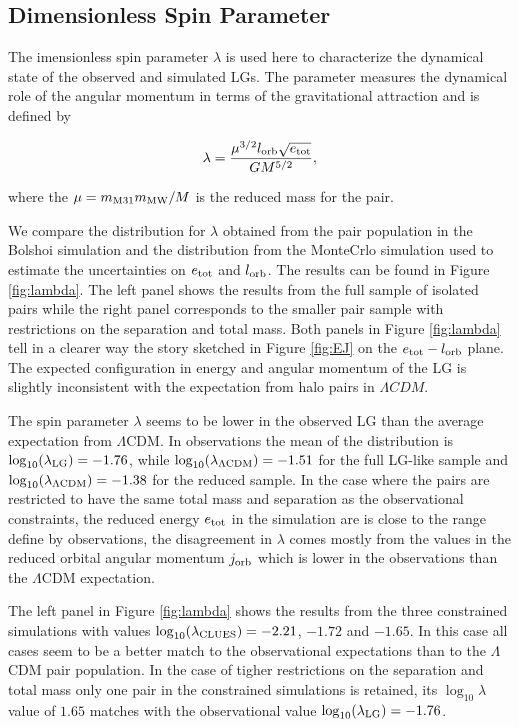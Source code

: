 \documentclass{emulateapj}
\begin{document}
\subsection{Dimensionless Spin Parameter}

The imensionless spin parameter $\lambda$ \citep{Peebles1971} is used here to characterize the dynamical state of the observed and simulated LGs. The parameter measures the dynamical role of the angular momentum in terms of the gravitational attraction and is defined by

\begin{equation}
\lambda = \frac{\mu^{3/2} l_{\rm orb} \sqrt{e_{\rm tot}}}{G M^{5/2}}, 
\end{equation}

where the $\mu=m_{\rm M31}m_{\rm MW}/M$ is the reduced mass for the pair.


We compare the distribution for  $\lambda$ obtained from the pair population in the Bolshoi simulation and the distribution from the MonteCrlo simulation used to estimate the uncertainties on $e_{\rm tot}$ and $l_{\rm orb}$. The results can be found in Figure \ref{fig:lambda}. The left panel shows the results from the full sample of isolated pairs while the right panel corresponds to the smaller pair sample with restrictions on the separation and total mass. Both panels in Figure \ref{fig:lambda} tell in a clearer way the story sketched in Figure \ref{fig:EJ} on the $e_{\rm tot}-l_{\rm orb}$ plane. The expected configuration in energy and angular momentum of the LG is slightly inconsistent with the expectation from halo pairs in $\Lambda CDM$. 

The spin parameter $\lambda$ seems to be lower in the observed LG than the average expectation from $\Lambda$CDM. In observations the mean of the distribution is $\log_{10}(\lambda_{\rm LG})=-1.76$, while $\log_{10}(\lambda_{\rm \Lambda CDM})=-1.51$ for the full LG-like sample and $\log_{10}(\lambda_{\rm \Lambda CDM})=-1.38$ for the reduced sample. In the case where the pairs are restricted to have the same total mass and separation as the observational constraints, the reduced energy $e_{\rm tot }$ in the simulation are is close to the range define by observations, the disagreement in $\lambda$ comes mostly from the values in the reduced orbital angular momentum $j_{\rm orb}$ which is lower in the observations than the $\Lambda$CDM expectation.

The left panel in Figure \ref{fig:lambda} shows the results from the three constrained simulations with values $\log_{10}(\lambda_{\rm CLUES})=-2.21$, $-1.72$ and $-1.65$. In this case all cases seem to be a better match to the observational expectations than to the $\Lambda$CDM pair population. In the case of tigher restrictions on the separation and total mass only one pair in the constrained simulations is retained, its $\log_{10}\lambda$ value of $1.65$ matches with the observational value $\log_{10}(\lambda_{\rm LG})=-1.76$.
\end{document}
